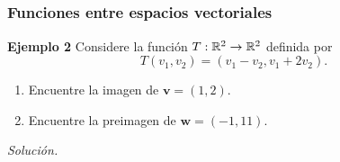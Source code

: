 \subsection{}

\begin{frame}\frametitle{Funciones entre espacios vectoriales}
	
	\begin{ej}{\textbf{Ejemplo 2}}
		\justifying
		Considere la función $T:\mathbb{R}^2\to \mathbb{R}^2$ definida por 
		\[
		T(v_1,v_2) = (v_1-v_2, v_1+2v_2).
		\]
		
		\vspace{-2mm}
		\begin{enumerate}
			\item[\labelname{$a$}] Encuentre la imagen de $\mathbf{v}=(1,2)$.
			\item[\labelname{$b$}] Encuentre la preimagen de $\mathbf{w}=(-1,11)$.
		\end{enumerate}
	\end{ej}
	\textit{Solución.}
	
\end{frame}


\subsection{}

